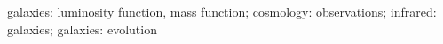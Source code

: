 \begin{keywords}
galaxies: luminosity function, mass function; cosmology: observations; infrared: galaxies; galaxies: evolution
\end{keywords}

\maketitle


